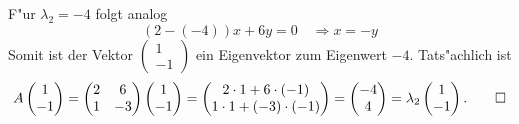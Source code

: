 \begin{loesung}
F"ur $\lambda_2=-4$ folgt analog
\[
(2-(-4))x+6y=0\quad\Rightarrow x=-y
\]
Somit ist der Vektor
$\begin{pmatrix}1\\-1\end{pmatrix}$
ein Eigenvektor zum Eigenwert $-4$. Tats"achlich ist
\[
A
\begin{pmatrix}1\\-1\end{pmatrix}
=
\begin{pmatrix}
2&6\\
1&-3
\end{pmatrix}
\begin{pmatrix}1\\-1\end{pmatrix}
=
\begin{pmatrix}
2\cdot 1 +6\cdot(-1)\\
1\cdot1+(-3)\cdot(-1)
\end{pmatrix}
=
\begin{pmatrix}
-4\\
4
\end{pmatrix}
=\lambda_2
\begin{pmatrix}1\\-1\end{pmatrix}.
\qedhere
\]
\end{loesung}

